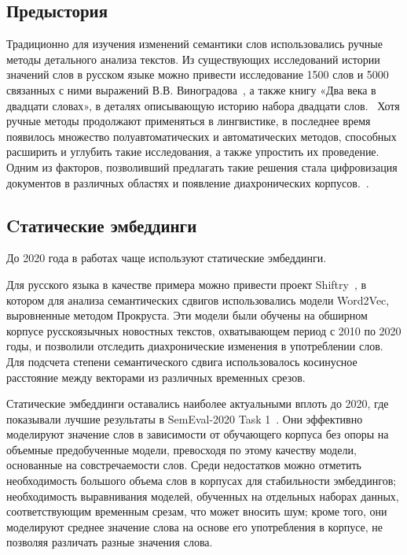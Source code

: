 \documentclass[LI,VKR]{HSEUniversity}
\begin{document}
\subsection{Предыстория}

Традиционно для изучения изменений семантики слов использовались ручные методы детального
анализа текстов.
Из существующих исследований истории значений слов в русском языке можно привести
исследование 1500 слов и 5000 связанных с ними выражений В.В. Виноградова~\cite{VinogradovWordHistory}, а также
книгу «Два века в двадцати словах», в деталях описывающую историю набора двадцати слов.~\cite{TwoCenturies}
Хотя ручные методы продолжают применяться в лингвистике, в последнее время появилось
множество полуавтоматических и автоматических методов,
способных расширить и углубить такие исследования, а также упростить их проведение.
Одним из факторов, позволивший предлагать такие решения стала цифровизация документов
в различных областях и появление диахронических корпусов.~\cite{TahmasebiComputationalApproachesToSemanticChange}.

\subsection{Cтатические эмбеддинги}

До 2020 года в работах чаще используют статические эмбеддинги.

Для русского языка в качестве примера можно привести проект Shiftry~\cite{shiftry},
в котором для анализа семантических сдвигов использовались модели Word2Vec,
выровненные методом Прокруста.
Эти модели были обучены на обширном корпусе русскоязычных новостных текстов,
охватывающем период с 2010 по 2020 годы, и позволили отследить диахронические изменения
в употреблении слов.
Для подсчета степени семантического сдвига использовалось косинусное расстояние между
векторами из различных временных срезов.

Статические эмбеддинги оставались наиболее актуальными вплоть до 2020,
где показывали лучшие результаты в SemEval-2020 Task 1~\cite{semeval2020task}.
Они эффективно моделируют значение слов в зависимости от обучающего корпуса
без опоры на объемные предобученные модели,
превосходя по этому качеству модели, основанные на совстречаемости слов.
Среди недостатков можно отметить необходимость большого объема слов в корпусах
для стабильности эмбеддингов;
необходимость выравнивания моделей, обученных на отдельных наборах данных,
соответствующим временным срезам, что может вносить шум;
кроме того, они моделируют среднее значение слова на основе его употребления в корпусе,
не позволяя различать разные значения слова.
\end{document}
